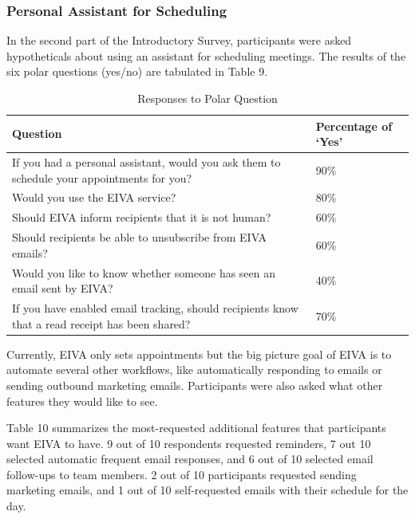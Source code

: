 \documentclass{article}
\begin{document}
\subsubsection{Personal Assistant for Scheduling}

In the second part of the Introductory Survey, participants were asked hypotheticals about using an assistant for scheduling meetings. The results of the six polar questions (yes/no) are tabulated in Table 9.

\begin{table}[!htb]
	\begin{minipage}{1\linewidth}
		\caption{Responses to Polar Question}
		\centering
		\begin{tabular}{p{10cm}p{2cm}}
			\hline
			\textbf{Question}                                                                               & \textbf{Percentage of `Yes'} \\
			\hline
			If you had a personal assistant, would you ask them to schedule your appointments for you?      & 90\%                         \\
			Would you use the EIVA service?                                                                 & 80\%                         \\
			Should EIVA inform recipients that it is not human?                                             & 60\%                         \\
			Should recipients be able to unsubscribe from EIVA emails?                                      & 60\%                         \\
			Would you like to know whether someone has seen an email sent by EIVA?                          & 40\%                         \\
			If you have enabled email tracking, should recipients know that a read receipt has been shared? & 70\%                         \\
			\hline
		\end{tabular}
	\end{minipage}%
\end{table}

Currently, EIVA only sets appointments but the big picture goal of EIVA is to automate several other workflows, like automatically responding to emails or sending outbound marketing emails. Participants were also asked what other features they would like to see.

Table 10 summarizes the most-requested additional features that participants want EIVA to have. 9 out of 10 respondents requested reminders, 7 out 10 selected automatic frequent email responses, and 6 out of 10 selected email follow-ups to team members. 2 out of 10 participants requested sending marketing emails, and 1 out of 10 self-requested emails with their schedule for the day.
\end{document}
